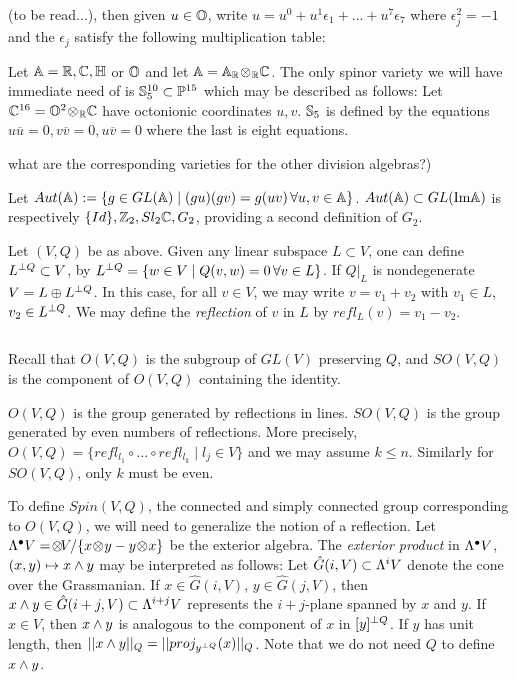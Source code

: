  (to be read...), then given $u\in\Bbb O$,
write $u= u^0+ u^1\epsilon_1+\hdots + u^7\epsilon_7$ where
$\epsilon_j^2=-1$
and the $\epsilon_j$ satisfy the following multiplication table:
$$
\
$$

  Let $\Bbb A =\Bbb R,\Bbb C, \Bbb H$ or $\Bbb O$ and let $\Bbb A = \Bbb
A_{\Bbb R}\!\otimes\!_{\Bbb R} \Bbb C$. 
The only spinor variety we will have immediate need of
is $\Bbb S^{10}_5\subset\Bbb P^{15}$ which may be described as follows:
Let $\Bbb C^{16}=\Bbb O^2\!\otimes\!_{\Bbb R}\Bbb C$ have octonionic coordinates
$u,v$.
$\Bbb S_5$ is defined by the equations $u\overline u=0, v\overline v=0,
u\overline v=0$ where the last is eight 
equations. 

 what are the corresponding varieties
for the other division algebras?)

\smallpagebreak 


Let  $Aut(\Bbb A):=
\{ g\in GL(\Bbb A) \mid (gu)(gv)=g(uv)\,
\forall u,v\in\Bbb A\}$.
$Aut(\Bbb A)\subset GL(\text{Im}\Bbb A)$ is
respectively   $\{Id\}, \Bbb Z_2, Sl_2\Bbb C, G_2$, providing a second
definition of $G_2$.

 


 Let  
$(V,Q)$ be as above. Given any linear subspace $L\subset V$,
one can define $L{}^{\perp Q}\subset V$,
by $L{}^{\perp Q} = \{ w\in V\mid Q(v,w)=0\, \forall v\in L\}$.
If $Q|_L$ is nondegenerate
$V= L\oplus L{}^{\perp Q}$. In this case, for all $v\in V$, we may
write $v= v_1+v_2$ with $v_1\in L$, $v_2\in L{}^{\perp Q}$. We may
define the {\it reflection} of $v$ in $L$ by $refl_L(v)= v_1-v_2$.

$$
\ 
$$

Recall that $O(V,Q)$ is the subgroup of $GL(V)$ preserving $Q$,
and $SO(V,Q)$ is the  component of  $O(V,Q)$
containing the identity.

$O(V,Q)$ is the group generated by   reflections in lines.
$SO(V,Q)$ is the group generated by even numbers of reflections.
More precisely, $O(V,Q)=
\{ refl_{l_1}\circ\hdots\circ refl_{l_k}\mid l_j\in  V\}$
and we may assume $k\leq n$. Similarly for $SO(V,Q)$, only $k$
must be even.
\endproclaim

To define $Spin(V,Q)$,
the connected and
simply connected
group corresponding to $O(V,Q)$, 
 we will need to
generalize the notion of a reflection. Let 
$  \Lambda^{\bullet} V= \!\otimes\! V/\{ x\!\otimes\! y-y\!\otimes\! x\}$ be the exterior algebra.
The {\it exterior product} in
$\Lambda^{\bullet} V$, $(x,y)\mapsto x\wedge y$ may be interpreted as follows:
Let $\hat G(i,V)\subset\Lambda^{i} V$ denote the cone over the Grassmanian.
If $x\in \hat G(i,V)$, $y\in \hat G(j, V)$,
  then $x\wedge y\in \hat G(i+j, V)\subset \Lambda^{i+j}V$
represents the $i+j$-plane spanned by $x$ and $y$.
If $x\in V$, then $x\wedge y$ is analogous to the component of $x$
in $[y]{}^{\perp Q}$. If
$y$ has unit length, then $||x\wedge y||_Q= ||proj_{y{}^{\perp Q}}(x)||_Q$.
Note that we do  not need $Q$ to define $x\wedge y$.

